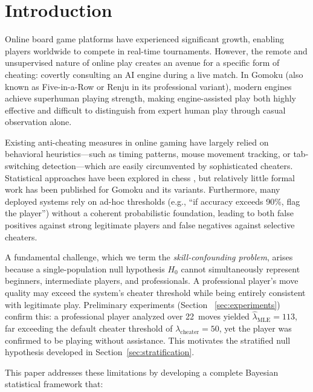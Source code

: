 \documentclass[11pt,a4paper]{article}
\begin{document}
\section{Introduction}
\label{sec:introduction}

Online board game platforms have experienced significant growth, enabling
players worldwide to compete in real-time tournaments. However, the remote and
unsupervised nature of online play creates an avenue for a specific form of
cheating: covertly consulting an AI engine during a live match. In Gomoku
(also known as Five-in-a-Row or Renju in its professional variant), modern
engines achieve superhuman playing strength, making engine-assisted play both
highly effective and difficult to distinguish from expert human play through
casual observation alone.

Existing anti-cheating measures in online gaming have largely relied on
behavioral heuristics---such as timing patterns, mouse movement tracking,
or tab-switching detection---which are easily circumvented by sophisticated
cheaters. Statistical approaches have been explored in chess
\citep{regan2011intrinsic}, but relatively little formal work has been
published for Gomoku and its variants. Furthermore, many deployed systems
rely on ad-hoc thresholds (e.g., ``if accuracy exceeds 90\%, flag the
player'') without a coherent probabilistic foundation, leading to both
false positives against strong legitimate players and false negatives
against selective cheaters.

A fundamental challenge, which we term the \emph{skill-confounding problem},
arises because a single-population null hypothesis $H_0$ cannot simultaneously
represent beginners, intermediate players, and professionals. A professional
player's move quality may exceed the system's cheater threshold while being
entirely consistent with legitimate play. Preliminary experiments (Section~%
\ref{sec:experiments}) confirm this: a professional player analyzed over
22~moves yielded $\hat{\lambda}_{\text{MLE}} = 113$, far exceeding the default
cheater threshold of $\lambda_{\text{cheater}} = 50$, yet the player was
confirmed to be playing without assistance. This motivates the stratified null
hypothesis developed in Section~\ref{sec:stratification}.

This paper addresses these limitations by developing a complete Bayesian
statistical framework that:
\end{document}
